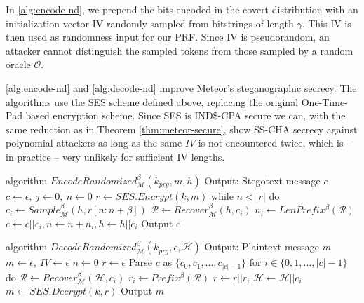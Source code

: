 In \autoref{alg:encode-nd}, we prepend the bits encoded in the covert distribution with an initialization vector IV randomly sampled from bitstrings of length $\gamma$.
This IV is then used as randomness input for our PRF.
Since IV is pseudorandom, an attacker cannot distinguish the sampled tokens from those sampled by a random oracle $\mathcal{O}$.

\autoref{alg:encode-nd} and \autoref{alg:decode-nd} improve Meteor's steganographic secrecy.
The algorithms use the SES scheme defined above, replacing the original One-Time-Pad based encryption scheme.
Since SES is IND\$-CPA secure we can, with the same reduction as in Theorem \ref{thm:meteor-secure}, show SS-CHA secrecy against polynomial attackers as long as the same $IV$ is not encountered twice, which is -- in practice -- very unlikely for sufficient IV lengths.


\begin{Pseudocode}[float, caption={
Meteor EncodeRandomized Algorithm.
This algorithm differs from the original Encode algorithm by using a SES to encrypt the message.
The ciphertext (which is indistinguishable from randomness) is then used to sample from $\mathcal{M}$.
}, label={alg:encode-nd}]
algorithm $EncodeRandomized_{\mathcal{M}}^{\beta}(k_{prg}, m, h)$
	Output: Stegotext message $c$
	$c \leftarrow \epsilon,~ j \leftarrow 0,~ n \leftarrow 0$
	$r \leftarrow SES.Encrypt(k, m)$
	while $n < |r|$ do
		$c_i \leftarrow Sample_{\mathcal{M}}^\beta(h, r[n: n+\beta])$
		$\mathcal{R} \leftarrow Recover_{\mathcal{M}}^\beta(h, c_i)$
		$n_i \leftarrow LenPrefix^\beta(\mathcal{R})$
		$c \leftarrow c || c_i, n \leftarrow n+n_i, h \leftarrow h||c_i$
	Output $c$
\end{Pseudocode}
\begin{Pseudocode}[float, caption={
Meteor DecodeRandomized Algorithm.
This algorithm differs from the original Decode algorithm by interpreting the first $\gamma$ bits of the hiddentext as IV.
After decoding $\gamma$ bits of hiddentext, a PRF is initialized with IV for generation of pseudorandom masks.}, label={alg:decode-nd}]
algorithm $DecodeRandomized_{\mathcal{M}}^{\beta}(k_{prg}, c, \mathcal{H})$
	Output: Plaintext message $m$
	$m \leftarrow \epsilon,~ IV \leftarrow \epsilon$
	$n \leftarrow 0$
	$r \leftarrow \epsilon$
	Parse $c$ as $\{ c_0, c_1, \dots, c_{|c|-1} \}$
	for $i \in \{0, 1, \dots, |c|-1 \}$ do
		$\mathcal{R} \leftarrow Recover_{\mathcal{M}}^\beta(\mathcal{H}, c_i)$
		$r_i \leftarrow Prefix^\beta(\mathcal{R})$
		$r \leftarrow r || r_i$
		$\mathcal{H} \leftarrow \mathcal{H}||c_i$
	$m \leftarrow SES.Decrypt(k, r)$
	Output $m$
\end{Pseudocode}